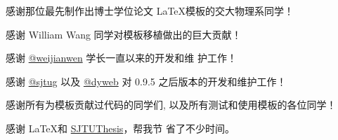 
\begin{acknowledgements}
  感谢那位最先制作出博士学位论文 \LaTeX 模板的交大物理系同学！

  感谢 William Wang 同学对模板移植做出的巨大贡献！

  感谢 \href{https://github.com/weijianwen}{@weijianwen} 学长一直以来的开发和维
  护工作！

  感谢 \href{https://github.com/sjtug}{@sjtug} 以及
   \href{https://github.com/dyweb}{@dyweb} 对 0.9.5 之后版本的开发和维护工作！

  感谢所有为模板贡献过代码的同学们, 以及所有测试和使用模板的各位同学！

  感谢 \LaTeX 和 \href{https://github.com/sjtug/SJTUThesis}{SJTUThesis}，帮我节
  省了不少时间。
\end{acknowledgements}
